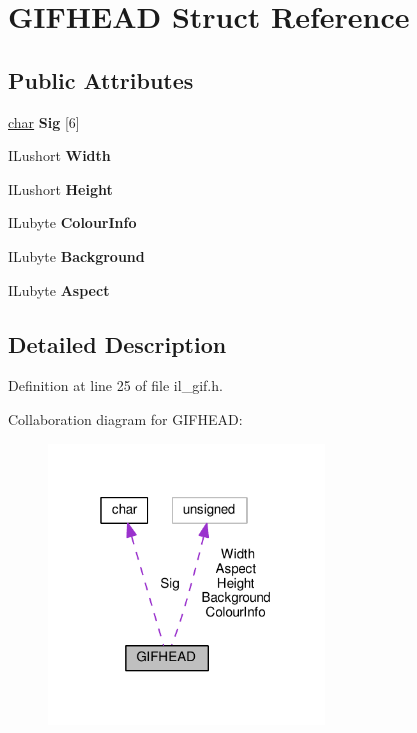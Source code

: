 \hypertarget{structGIFHEAD}{}\section{G\+I\+F\+H\+E\+AD Struct Reference}
\label{structGIFHEAD}
\subsection*{Public Attributes}
\begin{DoxyCompactItemize}
\item 
\mbox{\label{structGIFHEAD_a87737cba82a60b15496b2158c38eea15}} 
\hyperlink{classchar}{char} {\bfseries Sig} \mbox{[}6\mbox{]}
\item 
\mbox{\label{structGIFHEAD_a9277a349d47e07d5b1f8fa52e06ebecb}} 
I\+Lushort {\bfseries Width}
\item 
\mbox{\label{structGIFHEAD_aec6061af9983157326122611fd4ad5f8}} 
I\+Lushort {\bfseries Height}
\item 
\mbox{\label{structGIFHEAD_a1e508fffd5908aa57759e35f63c176c9}} 
I\+Lubyte {\bfseries Colour\+Info}
\item 
\mbox{\label{structGIFHEAD_a9cb2a66c4c04b45c099174b792dd60d6}} 
I\+Lubyte {\bfseries Background}
\item 
\mbox{\label{structGIFHEAD_a11b332a86a4c788f0826e42079ef4233}} 
I\+Lubyte {\bfseries Aspect}
\end{DoxyCompactItemize}


\subsection{Detailed Description}


Definition at line 25 of file il\+\_\+gif.\+h.



Collaboration diagram for G\+I\+F\+H\+E\+AD\+:
\nopagebreak
\begin{figure}[H]
\begin{center}
\leavevmode
\includegraphics[width=208pt]{d7/df3/structGIFHEAD__coll__graph}
\end{center}
\end{figure}


